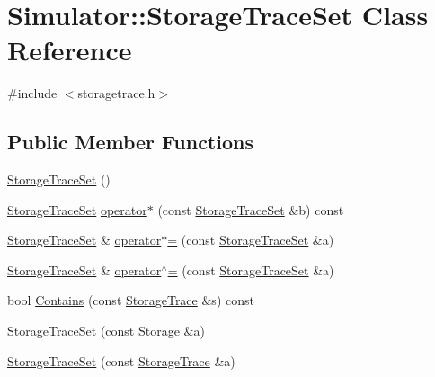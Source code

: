 \hypertarget{class_simulator_1_1_storage_trace_set}{\section{Simulator\+:\+:Storage\+Trace\+Set Class Reference}
\label{class_simulator_1_1_storage_trace_set}
}


{\ttfamily \#include $<$storagetrace.\+h$>$}

\subsection*{Public Member Functions}
\begin{DoxyCompactItemize}
\item 
\hyperlink{class_simulator_1_1_storage_trace_set_a70c65d988431d69d1073ac08a598de1e}{Storage\+Trace\+Set} ()
\item 
\hyperlink{class_simulator_1_1_storage_trace_set}{Storage\+Trace\+Set} \hyperlink{class_simulator_1_1_storage_trace_set_ac59e127da44a4dd447b0e6439273d8a0}{operator$\ast$} (const \hyperlink{class_simulator_1_1_storage_trace_set}{Storage\+Trace\+Set} \&b) const 
\item 
\hyperlink{class_simulator_1_1_storage_trace_set}{Storage\+Trace\+Set} \& \hyperlink{class_simulator_1_1_storage_trace_set_ac86f99205a2ac49323090699b854bd14}{operator$\ast$=} (const \hyperlink{class_simulator_1_1_storage_trace_set}{Storage\+Trace\+Set} \&a)
\item 
\hyperlink{class_simulator_1_1_storage_trace_set}{Storage\+Trace\+Set} \& \hyperlink{class_simulator_1_1_storage_trace_set_aff74a90675d422cd0869be7ffdd8c995}{operator$^\wedge$=} (const \hyperlink{class_simulator_1_1_storage_trace_set}{Storage\+Trace\+Set} \&a)
\item 
bool \hyperlink{class_simulator_1_1_storage_trace_set_a72874e25ac3eb9bdfa3cfb9d19c2ed93}{Contains} (const \hyperlink{class_simulator_1_1_storage_trace}{Storage\+Trace} \&s) const 
\item 
\hyperlink{class_simulator_1_1_storage_trace_set_a01b6b679afd7d701a369c9df544e16fb}{Storage\+Trace\+Set} (const \hyperlink{class_simulator_1_1_storage}{Storage} \&a)
\item 
\hyperlink{class_simulator_1_1_storage_trace_set_ad1a769d2559572b753d3864b77585ed0}{Storage\+Trace\+Set} (const \hyperlink{class_simulator_1_1_storage_trace}{Storage\+Trace} \&a)
\end{DoxyCompactItemize}
